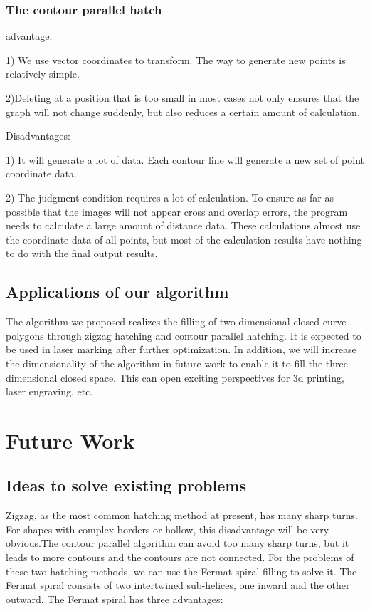 \documentclass{apmcmthesis}
\begin{document}
\subsubsection{The contour parallel hatch}


advantage:


1) We use vector coordinates to transform. The way to generate new points is relatively simple.


2)Deleting at a position that is too small in most cases not only ensures that the graph will not change suddenly, but also reduces a certain amount of calculation.


Disadvantages:


1) It will generate a lot of data. Each contour line will generate a new set of point coordinate data.


2) The judgment condition requires a lot of calculation. To ensure as far as possible that the images will not appear cross and overlap errors, the program needs to calculate a large amount of distance data. These calculations almost use the coordinate data of all points, but most of the calculation results have nothing to do with the final output results.

\subsection{Applications of our algorithm}

The algorithm we proposed realizes the filling of two-dimensional closed curve polygons through zigzag hatching and contour parallel hatching. It is expected to be used in laser marking after further optimization. In addition, we will increase the dimensionality of the algorithm in future work to enable it to fill the three-dimensional closed space. This can open exciting perspectives for 3d printing, laser engraving, etc.

\section{Future Work}
\subsection{Ideas to solve existing problems}
Zigzag, as the most common hatching method at present, has many sharp turns. For shapes with complex borders or hollow, this disadvantage will be very obvious.The contour parallel algorithm can avoid too many sharp turns, but it leads to more contours and the contours are not connected. For the problems of these two hatching methods, we can use the Fermat spiral filling to solve it. The Fermat spiral consists of two intertwined sub-helices, one inward and the other outward. The Fermat spiral has three advantages:
\end{document}
